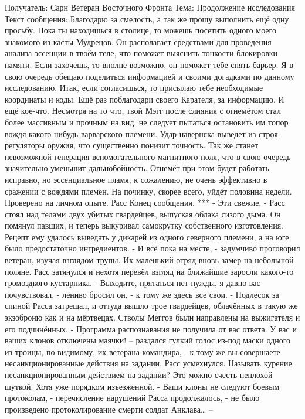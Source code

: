 \documentclass[a4paper, 12pt]{report}
\begin{document}
Получатель: Сарн Ветеран Восточного Фронта
Тема: Продолжение исследования
Текст сообщения:	
	Благодарю за смелость, а так же прошу выполнить ещё одну просьбу. Пока ты находишься в столице, то можешь посетить одного моего знакомого из касты Мудрецов. Он располагает средствами для проведения анализа эссенции в твоём теле, что поможет выяснить тонкости блокировки памяти. Если захочешь, то вполне возможно, он поможет тебе снять барьер. Я в свою очередь обещаю поделиться информацией и своими догадками по данному исследованию. 
Итак, если согласишься, то присылаю тебе необходимые координаты и коды.
Ещё раз поблагодари своего Карателя, за информацию.
	И ещё кое-что. Несмотря на то что, твой Мэгг после слияния с огнемётом стал более массивным и прочным на вид, не следует пытаться остановить им топор вождя какого-нибудь варварского племени. Удар наверняка выведет из строя регуляторы оружия, что существенно понизит точность. Так же станет невозможной генерация вспомогательного магнитного поля, что в свою очередь значительно уменьшит дальнобойность. Огнемёт при этом будет работать исправно, но эссенциальное пламя, к сожалению, не очень эффективно в сражении с вождями племён. На починку, скорее всего, уйдёт половина недели. 
Проверено на личном опыте.
Расс
Конец сообщения. 
***
	- Эти свежие, - Расс стоял над телами двух убитых гвардейцев, выпуская облака сизого дыма. Он помянул павших, и теперь выкуривал самокрутку собственного изготовления. Рецепт ему удалось выведать у дикарей из одного северного племени, а на юге было предостаточно ингредиентов.
	- И всё пока на месте, - задумчиво проговорил ветеран, изучая взглядом трупы. 
Их маленький отряд вновь замер на небольшой поляне. Расс затянулся и нехотя перевёл взгляд на ближайшие заросли какого-то громоздкого кустарника.
	- Выходите, прятаться нет нужды, я давно вас почувствовал, - лениво бросил он, - к тому же здесь все свои. - 
	Подлесок за спиной Расса затрещал, и оттуда вышло трое гвардейцев, облачённых в такую же экзоброню как и на мёртвецах. Стволы Меггов были направлены на выжигателя и его подчинённых.
	- Программа распознавания не получила от вас ответа. У вас и ваших клонов отключены маячки! – раздался гулкий голос из-под маски одного из троицы, по-видимому, их ветерана командира, - к тому же вы совершаете несанкционированные действия на задании.
	Расс усмехнулся. Называть курение несанкционированным действием на задании? Это можно счесть неплохой шуткой. Хотя уже порядком изъезженной.
	- Ваши клоны не следуют боевым протоколам, - перечисление нарушений Расса продолжалось, - не было произведено протоколирование смерти солдат Анклава… –
\end{document}
